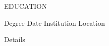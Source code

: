 
\begin{ResumeSection}{EDUCATION}

    \begin{DatedField}
        {Degree}
        {Date}
        {Institution}
        {Location}
        \item Details
    \end{DatedField}
    
\end{ResumeSection}